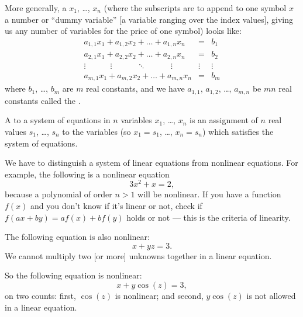More generally, a  
$x_{1}$, \dots, $x_{n}$ (where the subscripts are  to
append to one symbol $x$ a number or ``dummy variable'' [a variable
ranging over the index values], giving us any
number of variables for the price of one symbol) looks like:
\begin{equation}
\begin{array}{rcl}
a_{1,1}x_{1} + a_{1,2}x_{2} + \dots + a_{1,n}x_{n} &=& b_{1}\\
a_{2,1}x_{1} + a_{2,2}x_{2} + \dots + a_{2,n}x_{n} &=& b_{2}\\
\vdots\quad \qquad\vdots\quad\qquad\ddots\quad\qquad\vdots\quad & \vdots & \vdots\\
a_{m,1}x_{1} + a_{m,2}x_{2} + \dots + a_{m,n}x_{n} &=& b_{m}
\end{array}
\end{equation}
where $b_{1}$, \dots, $b_{m}$ are $m$ real constants, and we have
$a_{1,1}$, $a_{1,2}$, \dots, $a_{m,n}$ be $mn$ real constants called the
. 

A  to a system of equations in $n$ variables $x_{1}$,
\dots, $x_{n}$ is an assignment of $n$ real values $s_{1}$, \dots,
$s_{n}$ to the variables (so $x_{1}=s_{1}$, \dots, $x_{n}=s_{n}$) which
satisfies the system of equations.


\begin{example}
We have to distinguish a system of linear equations from nonlinear
equations. For example, the following is a nonlinear equation
\begin{equation}
3x^{2} + x = 2,
\end{equation}
because a polynomial of order $n>1$ will be nonlinear. If you have a
function $f(x)$ and you don't know if it's linear or not, check if
$f(ax+by)=af(x)+bf(y)$ holds or not --- this is the criteria of linearity.

The following equation is also nonlinear:
\begin{equation}
x + yz =3.
\end{equation}
We cannot multiply two [or more] unknowns together in a linear equation.

So the following equation is nonlinear:
\begin{equation}
x + y\cos(z) = 3,
\end{equation}
on two counts: first, $\cos(z)$ is nonlinear; and second, $y\cos(z)$ is
not allowed in a linear equation.
\end{example}


